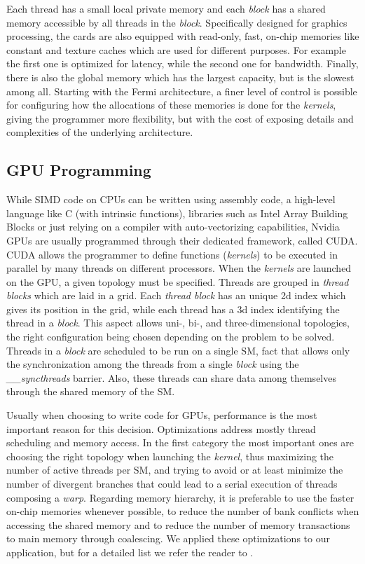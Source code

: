 Each thread has a small local private memory and each \textit{block} has a
shared memory accessible by all threads in the \textit{block}. Specifically
designed for graphics processing, the cards are also equipped with read-only,
fast, on-chip memories like constant and texture caches which are used for
different purposes. For example the first one is optimized for latency, while
the second one for bandwidth. Finally, there is also the global memory which has
the largest capacity, but is the slowest among all. Starting with the Fermi
architecture, a finer level of control is possible for configuring how the
allocations of these memories is done for the \textit{kernels}, giving the
programmer more flexibility, but with the cost of exposing details and
complexities of the underlying architecture.

\subsection{GPU Programming}

While SIMD code on CPUs can be written using assembly code, a high-level
language like C (with intrinsic functions), libraries such as Intel Array
Building Blocks or just relying on a compiler with auto-vectorizing
capabilities, Nvidia GPUs are usually  programmed through their dedicated
framework, called CUDA. CUDA allows the programmer to define functions
(\textit{kernels}) to be executed in parallel by many threads on different
processors. When the \textit{kernels} are launched on the GPU, a given topology
must be specified. Threads are grouped in \textit{thread blocks} which are laid
in a grid. Each \textit{thread block} has an unique 2d index which gives its
position in the grid, while each thread has a 3d index identifying the thread in
a \textit{block}. This aspect allows uni-, bi-, and three-dimensional
topologies, the right configuration being chosen depending on the problem to be
solved. Threads in a \textit{block} are scheduled to be run on a single SM, fact
that allows only the synchronization among the threads from a single
\textit{block} using the \emph{\_\_syncthreads} barrier. Also, these threads can
share data among themselves through the shared memory of the SM.

Usually when choosing to write code for GPUs, performance is the most important
reason for this decision. Optimizations address mostly thread scheduling and
memory access. In the first category the most important ones are choosing the
right topology when launching the \textit{kernel}, thus maximizing the number of
active threads per SM, and trying to avoid or at least minimize the number of
divergent branches that could lead to a serial execution of threads composing a
\textit{warp}. Regarding memory hierarchy, it is preferable to use the faster 
on-chip memories whenever possible, to reduce the number of bank conflicts when
accessing the shared memory and to reduce the number of memory transactions to
main memory through coalescing. We applied these optimizations to our
application, but for a detailed list we refer the reader to \cite{cuda}.
